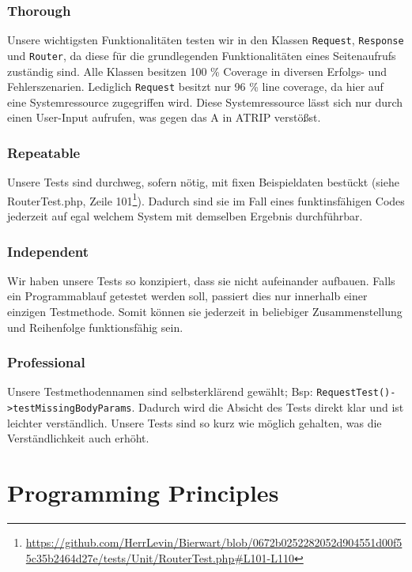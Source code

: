 \documentclass[12pt,a4paper,titlepage,ngerman,pdftex]{report}
\begin{document}
    \subsubsection{Thorough}\label{subsec:thorough}
    Unsere wichtigsten Funktionalitäten testen wir in den Klassen \verb|Request|, \verb|Response| und \verb|Router|, da diese für die grundlegenden Funktionalitäten eines Seitenaufrufs zuständig sind.
    Alle Klassen besitzen 100 \% Coverage in diversen Erfolgs- und Fehlerszenarien. Lediglich \verb|Request| besitzt nur 96 \% line coverage, da hier auf eine Systemressource zugegriffen wird.
    Diese Systemressource lässt sich nur durch einen User-Input aufrufen, was gegen das A in ATRIP verstößst.

    \subsubsection{Repeatable}
    Unsere Tests sind durchweg, sofern nötig, mit fixen Beispieldaten bestückt (siehe RouterTest.php, Zeile 101\footnote{\url{https://github.com/HerrLevin/Bierwart/blob/0672b0252282052d904551d00f55c35b2464d27e/tests/Unit/RouterTest.php\#L101-L110}}).
    Dadurch sind sie im Fall eines funktinsfähigen Codes jederzeit auf egal welchem System mit demselben Ergebnis durchführbar.

    \subsubsection{Independent}
    Wir haben unsere Tests so konzipiert, dass sie nicht aufeinander aufbauen.
    Falls ein Programmablauf getestet werden soll, passiert dies nur innerhalb einer einzigen Testmethode.
    Somit können sie jederzeit in beliebiger Zusammenstellung und Reihenfolge funktionsfähig sein.

    \subsubsection{Professional}
    Unsere Testmethodennamen sind selbsterklärend gewählt; Bsp: \verb|RequestTest()->testMissingBodyParams|.
    Dadurch wird die Absicht des Tests direkt klar und ist leichter verständlich.
    Unsere Tests sind so kurz wie möglich gehalten, was die Verständlichkeit auch erhöht.

    \section{Programming Principles}
    \label{sec:programmingprinciples}
\end{document}
